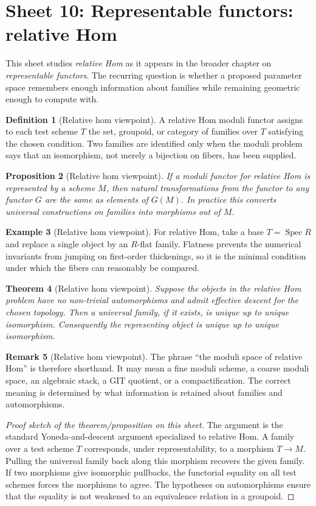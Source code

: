 \documentclass[11pt]{amsart}
\newtheorem{theorem}{Theorem}[section]
\newtheorem{proposition}[theorem]{Proposition}
\theoremstyle{definition}
\newtheorem{definition}[theorem]{Definition}
\newtheorem{example}[theorem]{Example}
\newtheorem{remark}[theorem]{Remark}
\newcommand{\Spec}{\operatorname{Spec}}
\begin{document}
\section{Sheet 10: Representable functors: relative Hom}
This sheet studies \emph{relative Hom} as it appears in the broader chapter on \emph{representable functors}.  The recurring question is whether a proposed parameter space remembers enough information about families while remaining geometric enough to compute with.
\begin{definition}[Relative hom viewpoint]
A relative Hom moduli functor assigns to each test scheme $T$ the set, groupoid, or category of families over $T$ satisfying the chosen condition.  Two families are identified only when the moduli problem says that an isomorphism, not merely a bijection on fibers, has been supplied.
\end{definition}
\begin{proposition}[Relative hom viewpoint]
If a moduli functor for relative Hom is represented by a scheme $M$, then natural transformations from the functor to any functor $G$ are the same as elements of $G(M)$.  In practice this converts universal constructions on families into morphisms out of $M$.
\end{proposition}
\begin{example}[Relative hom viewpoint]
For relative Hom, take a base $T=\Spec R$ and replace a single object by an $R$-flat family.  Flatness prevents the numerical invariants from jumping on first-order thickenings, so it is the minimal condition under which the fibers can reasonably be compared.
\end{example}
\begin{theorem}[Relative hom viewpoint]
Suppose the objects in the relative Hom problem have no non-trivial automorphisms and admit effective descent for the chosen topology.  Then a universal family, if it exists, is unique up to unique isomorphism.  Consequently the representing object is unique up to unique isomorphism.
\end{theorem}
\begin{remark}[Relative hom viewpoint]
The phrase ``the moduli space of relative Hom'' is therefore shorthand.  It may mean a fine moduli scheme, a coarse moduli space, an algebraic stack, a GIT quotient, or a compactification.  The correct meaning is determined by what information is retained about families and automorphisms.
\end{remark}
\begin{proof}[Proof sketch of the theorem/proposition on this sheet]
The argument is the standard Yoneda-and-descent argument specialized to relative Hom.  A family over a test scheme $T$ corresponds, under representability, to a morphism $T\to M$.  Pulling the universal family back along this morphism recovers the given family.  If two morphisms give isomorphic pullbacks, the functorial equality on all test schemes forces the morphisms to agree.  The hypotheses on automorphisms ensure that the equality is not weakened to an equivalence relation in a groupoid.
\end{proof}
\end{document}
